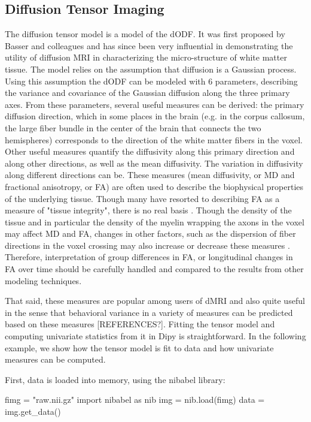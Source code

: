\documentclass{bioinfo}
\begin{document}
\subsection{Diffusion Tensor Imaging}

The diffusion tensor model is a model of the dODF. It was first proposed by Basser and colleagues \citep{basser-mattiello-etal:94} and has since been very influential in demonstrating the utility of diffusion MRI in characterizing the micro-structure of white matter tissue. The model relies on the assumption that diffusion is a Gaussian process. Using this assumption the dODF can be modeled with 6 parameters, describing the variance and covariance of the Gaussian diffusion along the three primary axes. From these parameters, several useful measures can be derived: the primary diffusion direction, which in some places in the brain (e.g. in the corpus callosum, the large fiber bundle in the center of the brain that connects the two hemispheres) corresponds to the direction of the white matter fibers in the voxel. Other useful measures quantify the diffusivity along this primary direction and along other directions, as well as the mean diffusivity. The variation in diffusivity along different directions can be. These measures (mean diffusivity, or MD and fractional anisotropy, or FA) are often used to describe the biophysical properties of the underlying tissue. Though many have resorted to describing FA as a measure of "tissue integrity", there is no real basis . Though the density of the tissue and in particular the density of the myelin wrapping the axons in the voxel may affect MD and FA, changes in other factors, such as the dispersion of fiber directions in the voxel crossing may also increase or decrease these measures \citep{wandell-yeatman:13}. Therefore, interpretation of group differences in FA, or longitudinal changes in FA over time should be carefully handled and compared to the results from other modeling techniques.   

That said, these measures are popular among users of dMRI and also quite useful in the sense that behavioral variance in a variety of measures can be predicted based on these measures [REFERENCES?]. Fitting the tensor model and computing univariate statistics from it in Dipy is straightforward. In the following example, we show how the tensor model is fit to data and how univariate measures can be computed.

First, data is loaded into memory, using the nibabel library:
\begin{python}
fimg = "raw.nii.gz"
import nibabel as nib
img = nib.load(fimg)
data = img.get_data()

\end{python}
\end{document}
